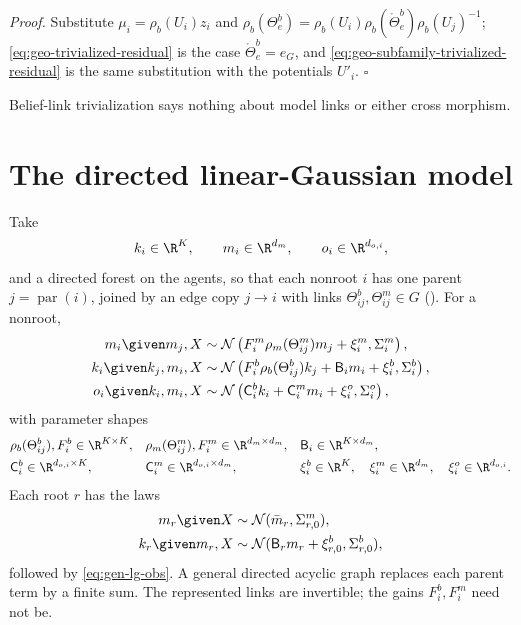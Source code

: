 \noindent\emph{Proof.}
Substitute \(\mu_i=\rho_b(U_i)z_i\) and
\(\rho_b(\Theta^b_e)=\rho_b(U_i)\rho_b(\mathring\Theta^b_e)\rho_b(U_j)^{-1}\);
\eqref{eq:geo-trivialized-residual} is the case \(\mathring\Theta^b_e=e_G\), and
\eqref{eq:geo-subfamily-trivialized-residual} is the same substitution with the
potentials \(U'_i\). \(\square\)

Belief-link trivialization says nothing about model links or either cross
morphism.

\section{The directed linear-Gaussian model}
\label{sec:gen-gaussian}

Take
\begin{equation}
k_i\in\R^K,
\qquad
m_i\in\R^{d_m},
\qquad
o_i\in\R^{d_{o,i}},
\label{eq:gen-lg-domains}
\end{equation}
and a directed forest on the agents, so that each nonroot \(i\) has one parent
\(j=\operatorname{par}(i)\), joined by an edge copy \(j\to i\) with links
\(\Theta^b_{ij},\Theta^m_{ij}\in G\) (). For a
nonroot,
\begin{align}
m_i\given m_j,X
&\sim\mathcal N\left(
F_i^m\rho_m(\Theta_{ij}^m)m_j+\xi_i^m,
\Sigma_i^m\right),
\label{eq:gen-lg-model}\\
k_i\given k_j,m_i,X
&\sim\mathcal N\left(
F_i^b\rho_b(\Theta_{ij}^b)k_j+\mathsf B_im_i+\xi_i^b,
\Sigma_i^b\right),
\label{eq:gen-lg-state}\\
o_i\given k_i,m_i,X
&\sim\mathcal N\left(
\mathsf C_i^bk_i+\mathsf C_i^mm_i+\xi_i^o,
\Sigma_i^o\right),
\label{eq:gen-lg-obs}
\end{align}
with parameter shapes
\begin{align}
&\rho_b(\Theta_{ij}^b),F_i^b\in\R^{K\times K},
&&\rho_m(\Theta_{ij}^m),F_i^m\in\R^{d_m\times d_m},
&&\mathsf B_i\in\R^{K\times d_m},
\label{eq:gen-lg-shapes-latent}\\
&\mathsf C_i^b\in\R^{d_{o,i}\times K},
&&\mathsf C_i^m\in\R^{d_{o,i}\times d_m},
&&\xi_i^b\in\R^K,
\quad
\xi_i^m\in\R^{d_m},
\quad
\xi_i^o\in\R^{d_{o,i}}.
\label{eq:gen-lg-shapes-obs}
\end{align}
Each root \(r\) has the laws
\begin{align}
m_r\given X
&\sim\mathcal N(\bar m_r,\Sigma_{r,0}^m),
\label{eq:gen-lg-root-model}\\
k_r\given m_r,X
&\sim\mathcal N(\mathsf B_rm_r+\xi_{r,0}^b,\Sigma_{r,0}^b),
\label{eq:gen-lg-root-state}
\end{align}
followed by \eqref{eq:gen-lg-obs}. A general directed acyclic graph replaces
each parent term by a finite sum. The represented links are invertible; the
gains \(F_i^b,F_i^m\) need not be.

